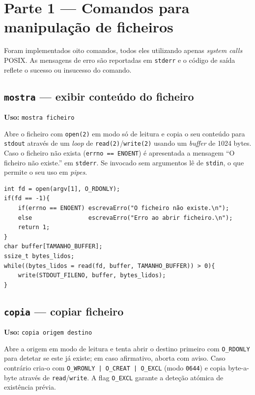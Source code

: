 \documentclass[11pt,a4paper]{article}
\begin{document}
\section{Parte 1 --- Comandos para manipulação de ficheiros}

Foram implementados oito comandos, todos eles utilizando apenas \textit{system calls} POSIX. As mensagens de erro são reportadas em \texttt{stderr} e o código de saída reflete o sucesso ou insucesso do comando.

\subsection{\texttt{mostra} --- exibir conteúdo do ficheiro}

\textbf{Uso:} \texttt{mostra ficheiro}

Abre o ficheiro com \texttt{open(2)} em modo só de leitura e copia o seu conteúdo para \texttt{stdout} através de um \textit{loop} de \texttt{read(2)}/\texttt{write(2)} usando um \textit{buffer} de 1024 bytes. Caso o ficheiro não exista (\texttt{errno == ENOENT}) é apresentada a mensagem ``O ficheiro não existe.'' em \texttt{stderr}. Se invocado sem argumentos lê de \texttt{stdin}, o que permite o seu uso em \textit{pipes}.

\begin{lstlisting}[style=cstyle,caption={Excerto de \texttt{mostra.c}}]
int fd = open(argv[1], O_RDONLY);
if(fd == -1){
    if(errno == ENOENT) escrevaErro("O ficheiro não existe.\n");
    else                escrevaErro("Erro ao abrir ficheiro.\n");
    return 1;
}
char buffer[TAMANHO_BUFFER];
ssize_t bytes_lidos;
while((bytes_lidos = read(fd, buffer, TAMANHO_BUFFER)) > 0){
    write(STDOUT_FILENO, buffer, bytes_lidos);
}
\end{lstlisting}

\subsection{\texttt{copia} --- copiar ficheiro}

\textbf{Uso:} \texttt{copia origem destino}

Abre a origem em modo de leitura e tenta abrir o destino primeiro com \texttt{O\_RDONLY} para detetar se este já existe; em caso afirmativo, aborta com aviso. Caso contrário cria-o com \texttt{O\_WRONLY | O\_CREAT | O\_EXCL} (modo \texttt{0644}) e copia byte-a-byte através de \texttt{read}/\texttt{write}. A flag \texttt{O\_EXCL} garante a deteção atómica de existência prévia.
\end{document}
